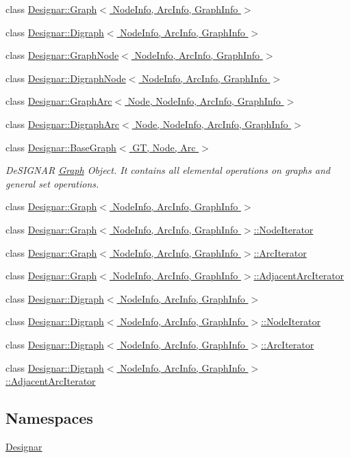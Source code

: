 \begin{DoxyCompactItemize}
\item 
class \hyperlink{class_designar_1_1_graph}{Designar\+::\+Graph$<$ Node\+Info, Arc\+Info, Graph\+Info $>$}
\item 
class \hyperlink{class_designar_1_1_digraph}{Designar\+::\+Digraph$<$ Node\+Info, Arc\+Info, Graph\+Info $>$}
\item 
class \hyperlink{class_designar_1_1_graph_node}{Designar\+::\+Graph\+Node$<$ Node\+Info, Arc\+Info, Graph\+Info $>$}
\item 
class \hyperlink{class_designar_1_1_digraph_node}{Designar\+::\+Digraph\+Node$<$ Node\+Info, Arc\+Info, Graph\+Info $>$}
\item 
class \hyperlink{class_designar_1_1_graph_arc}{Designar\+::\+Graph\+Arc$<$ Node, Node\+Info, Arc\+Info, Graph\+Info $>$}
\item 
class \hyperlink{class_designar_1_1_digraph_arc}{Designar\+::\+Digraph\+Arc$<$ Node, Node\+Info, Arc\+Info, Graph\+Info $>$}
\item 
class \hyperlink{class_designar_1_1_base_graph}{Designar\+::\+Base\+Graph$<$ G\+T, Node, Arc $>$}
\begin{DoxyCompactList}\small\item\em De\+S\+I\+G\+N\+AR \hyperlink{class_designar_1_1_graph}{Graph} Object. It contains all elemental operations on graphs and general set operations. \end{DoxyCompactList}\item 
class \hyperlink{class_designar_1_1_graph}{Designar\+::\+Graph$<$ Node\+Info, Arc\+Info, Graph\+Info $>$}
\item 
class \hyperlink{class_designar_1_1_graph_1_1_node_iterator}{Designar\+::\+Graph$<$ Node\+Info, Arc\+Info, Graph\+Info $>$\+::\+Node\+Iterator}
\item 
class \hyperlink{class_designar_1_1_graph_1_1_arc_iterator}{Designar\+::\+Graph$<$ Node\+Info, Arc\+Info, Graph\+Info $>$\+::\+Arc\+Iterator}
\item 
class \hyperlink{class_designar_1_1_graph_1_1_adjacent_arc_iterator}{Designar\+::\+Graph$<$ Node\+Info, Arc\+Info, Graph\+Info $>$\+::\+Adjacent\+Arc\+Iterator}
\item 
class \hyperlink{class_designar_1_1_digraph}{Designar\+::\+Digraph$<$ Node\+Info, Arc\+Info, Graph\+Info $>$}
\item 
class \hyperlink{class_designar_1_1_digraph_1_1_node_iterator}{Designar\+::\+Digraph$<$ Node\+Info, Arc\+Info, Graph\+Info $>$\+::\+Node\+Iterator}
\item 
class \hyperlink{class_designar_1_1_digraph_1_1_arc_iterator}{Designar\+::\+Digraph$<$ Node\+Info, Arc\+Info, Graph\+Info $>$\+::\+Arc\+Iterator}
\item 
class \hyperlink{class_designar_1_1_digraph_1_1_adjacent_arc_iterator}{Designar\+::\+Digraph$<$ Node\+Info, Arc\+Info, Graph\+Info $>$\+::\+Adjacent\+Arc\+Iterator}
\end{DoxyCompactItemize}
\subsection*{Namespaces}
\begin{DoxyCompactItemize}
\item 
 \hyperlink{namespace_designar}{Designar}
\end{DoxyCompactItemize}
